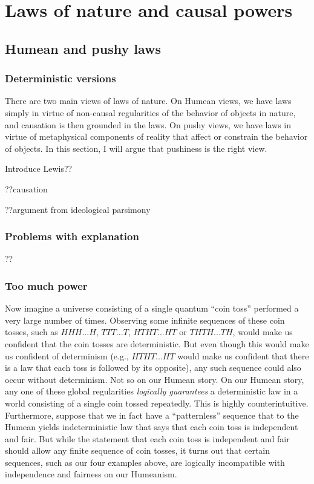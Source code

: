 \chaptertail 

\def\mychapter{IX}

\chapter{Laws of nature and causal powers}\label{ch:laws}
\section{Humean and pushy laws}
\subsection{Deterministic versions}
There are two main views of laws of nature. On Humean views, we have laws simply in virtue of non-causal 
regularities of the behavior of objects in nature, and causation is then grounded in the laws. On pushy views, 
we have laws in virtue of metaphysical components of reality that affect or constrain the behavior of objects. 
In this section, I will argue that pushiness is the right view. 

Introduce Lewis??

??causation

??argument from ideological parsimony

\subsection{Problems with explanation}
??

\subsection{Too much power}
Now imagine a universe consisting of a single quantum ``coin toss'' performed a very large number of times. Observing some 
infinite sequences of these coin tosses, such as $HHH...H$, $TTT...T$, $HTHT...HT$ or $THTH...TH$, would make us confident 
that the coin tosses are deterministic. But even though this would make us confident of determinism (e.g., $HTHT...HT$
would make us confident that there is a law that each toss is followed by its opposite), any such sequence could also
occur without determinism. Not so on our Humean story. On our Humean story, any one of these global regularities \textit{logically 
guarantees} a deterministic law in a world consisting of a single coin tossed repeatedly. This is highly counterintuitive. 
Furthermore, suppose that we in fact have a ``patternless'' sequence that to the Humean yields indeterministic law that says 
that each coin toss is independent and fair. But while the statement that each coin toss is independent and fair should allow any 
finite sequence of coin tosses, it turns out that certain sequences, such as our four examples above, are logically incompatible with 
independence and fairness on our Humeanism.


